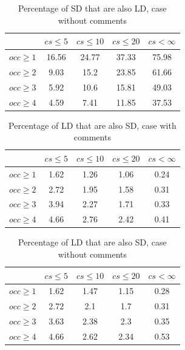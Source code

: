 \documentclass[a4paper,twoside]{article}
\begin{document}
\begin{table}[!h]
\renewcommand{\arraystretch}{1.2}
\caption{Percentage of SD that are also LD, case without comments}
\label{tab:percSD:nocomm}
\centering

\begin{tabular}{|c|c|c|c|c|}
\hline
	      &	$cs\leq 5$	&	$cs\leq 10$	&	$cs\leq 20$	&	$cs< \infty$	\\
\hline
$occ\geq 1$	&	16.56	&	24.77	&	37.33	&	75.98	\\
$occ\geq 2$	&	9.03	&	15.2	&	23.85	&	61.66	\\
$occ\geq 3$	&	5.92	&	10.6	&	15.81	&	49.03	\\
$occ\geq 4$	&	4.59	&	7.41	&	11.85	&	37.53	\\
\hline
\end{tabular}
\end{table}


\begin{table}[!h]
\renewcommand{\arraystretch}{1.2}
\caption{Percentage of LD that are also SD, case with comments}
\label{tab:percLD:comm}
\centering

\begin{tabular}{|c|c|c|c|c|}
\hline
	      &	$cs\leq 5$	&	$cs\leq 10$	&	$cs\leq 20$	&	$cs< \infty$	\\
\hline
$occ\geq 1$	&	1.62	&	1.26	&	1.06	&	0.24	\\
$occ\geq 2$	&	2.72	&	1.95	&	1.58	&	0.31	\\
$occ\geq 3$	&	3.94	&	2.27	&	1.71	&	0.33	\\
$occ\geq 4$	&	4.66	&	2.76	&	2.42	&	0.41	\\
\hline
\end{tabular}
\end{table}


\begin{table}[!h]
\renewcommand{\arraystretch}{1.2}
\caption{Percentage of LD that are also SD, case without comments}
\label{tab:percLD:nocomm}
\centering
\begin{tabular}{|c|c|c|c|c|}
\hline
	      &	$cs\leq 5$	&	$cs\leq 10$	&	$cs\leq 20$	&	$cs< \infty$	\\
\hline
$occ\geq 1$	&	1.62	&	1.47	&	1.15	&	0.28	\\
$occ\geq 2$	&	2.72	&	2.1	&	1.7	&	0.31	\\
$occ\geq 3$	&	3.63	&	2.38	&	2.3	&	0.35	\\
$occ\geq 4$	&	4.66	&	2.62	&	2.34	&	0.53	\\
\hline
\end{tabular}
\end{table}
\end{document}
